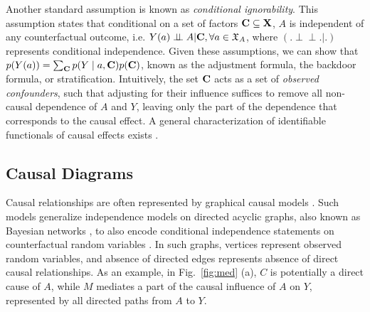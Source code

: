 \documentclass[letterpaper]{article} %
\newcommand{\citep}{\cite}
\def\ci{\perp\!\!\!\perp}
\begin{document}
Another standard assumption is known as \emph{conditional ignorability}.  This assumption states that conditional on a set of factors ${\bf C} \subseteq {\bf X}$, $A$ is independent of any counterfactual outcome, i.e. $Y(a) \ci A | {\bf C}, \forall a \in {\mathfrak X}_A$, where $(.\ci.|.)$ represents conditional independence. Given these assumptions, we can show that $p(Y(a)) %
= \sum_{\bf C} p(Y \mid a, {\bf C}) p({\bf C})$, 
known as the adjustment formula, the backdoor formula, or stratification.
Intuitively, the set ${\bf C}$ acts as a set of \emph{observed confounders}, such that adjusting for their influence suffices to remove all non-causal dependence of $A$ and $Y$, leaving only the part of the dependence that corresponds to the causal effect. %
A general characterization of identifiable functionals of causal effects exists \citep{tian02onid,shpitser07hierarchy}.

\subsection{Causal Diagrams}
\label{subsec:graphs}

Causal relationships are often represented by graphical causal models \citep{spirtes01causation,pearl09causality}.  Such models generalize independence models on directed acyclic graphs, also known as Bayesian networks \citep{pearl88probabilistic}, to also encode conditional independence statements on counterfactual random variables \citep{thomas13swig}.  In such graphs, vertices represent observed random variables, and absence of directed edges represents absence of direct causal relationships. 
As an example, in Fig.~\ref{fig:med} (a), $C$ is potentially a direct cause of $A$, while $M$ mediates a part of the causal influence of $A$ on $Y$, represented by all directed paths from $A$ to $Y$.
\end{document}

